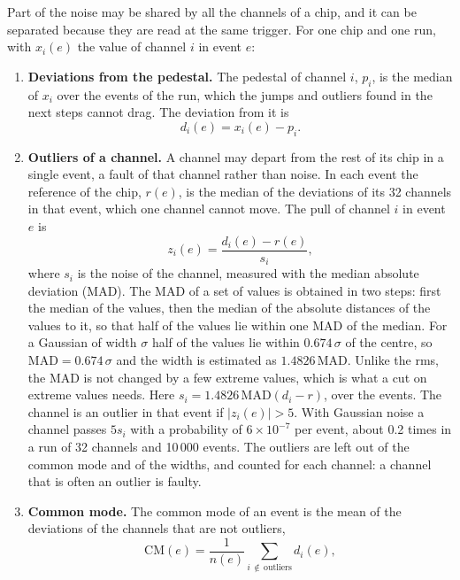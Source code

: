 \documentclass[11pt,a4paper]{article}
\begin{document}
Part of the noise may be shared by all the channels of a chip, and it can be separated because
they are read at the same trigger. For one chip and one run, with $x_i(e)$ the value of
channel $i$ in event $e$:
\begin{enumerate}
\item \textbf{Deviations from the pedestal.} The pedestal of channel $i$, $p_i$, is the median
  of $x_i$ over the events of the run, which the jumps and outliers found in the next steps
  cannot drag. The deviation from it is
  \begin{equation*}
  d_i(e) = x_i(e) - p_i .
  \end{equation*}
\item \textbf{Outliers of a channel.} A channel may depart from the rest of its chip in a
  single event, a fault of that channel rather than noise. In each event the reference of the
  chip, $r(e)$, is the median of the deviations of its 32 channels in that event, which one
  channel cannot move. The pull of channel $i$ in event $e$ is
  \begin{equation*}
  z_i(e) = \frac{d_i(e) - r(e)}{s_i} ,
  \end{equation*}
  where $s_i$ is the noise of the channel, measured with the median absolute deviation (MAD).
  The MAD of a set of values is obtained in two steps: first the median of
  the values, then the median of the absolute distances of the values to it, so that half of the
  values lie within one MAD of the median. For a Gaussian of width $\sigma$ half of the values
  lie within $0.674\,\sigma$ of the centre, so $\mathrm{MAD} = 0.674\,\sigma$ and the width is
  estimated as $1.4826\,\mathrm{MAD}$. Unlike the rms, the MAD is not changed by a few extreme
  values, which is what a cut on extreme values needs. Here $s_i = 1.4826\,\mathrm{MAD}(d_i - r)$, over
  the events. The channel is an outlier in that event if $|z_i(e)| > 5$. With Gaussian noise a
  channel passes $5 s_i$ with a probability of $6\times10^{-7}$ per event, about 0.2 times in
  a run of 32 channels and 10\,000 events. The outliers are left out of the common mode and of
  the widths, and counted for each channel: a channel that is often an outlier is faulty.
\item \textbf{Common mode.} The common mode of an event is the mean of the deviations of the
  channels that are not outliers,
  \begin{equation*}
  \mathrm{CM}(e) = \frac{1}{n(e)}\sum_{i \,\notin\, \text{outliers}} d_i(e) ,
  \end{equation*}

\end{enumerate}
\end{document}
